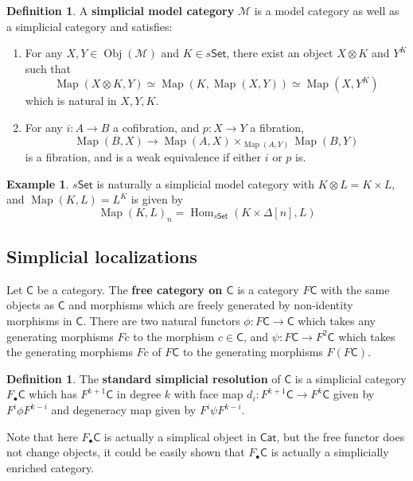 \documentclass[11pt]{amsart}
\numberwithin{equation}{section}
\theoremstyle{definition}
\newtheorem{example}[thm]{Example}
\newtheorem{defn}[thm]{Definition}
\theoremstyle{remark}
\numberwithin{equation}{section}
\newcommand{\CM}{{\mathcal M}}
\newcommand{\CC}{{\mathsf C}}
\newcommand{\ob}{\operatorname{Obj}}
\newcommand{\set}{\mathsf{Set}}
\newcommand{\cat}{\mathsf{Cat}}
\newcommand{\Hom}{\operatorname{Hom}}
\newcommand{\map}{\operatorname{Map}}
\begin{document}
\begin{defn}
	A {\bf simplicial model category} $\CM$ is a model category as well as a simplicial category and satisfies:
	\begin{enumerate}
		\item For any $X, Y \in \ob(\CM)$ and $K\in s\set$, there exist an object $X\otimes K$ and $Y^K$ such that
		\begin{equation*}
		\map(X\otimes K, Y)\simeq \map (K, \map (X,Y))\simeq \map (X, Y^K)
		\end{equation*} 
		which is natural in $X, Y, K$.
		\item  For any $i: A\to B$ a cofibration, and $p:X\to Y$ a fibration,
		\begin{equation*}
		 \map(B,X) \to \map (A,X) \times_{\map(A,Y)} \map(B, Y)
		\end{equation*}
		is a fibration, and is a weak equivalence if either $i$ or $p$ is.
	\end{enumerate}
\end{defn}

\begin{example}
	$s\set$ is naturally a simplicial model category with $K\otimes L = K \times L$, and $\map(K,L)=L^K$ is given by
	\begin{equation*}
	\map(K,L)_n = \Hom_{s\set}(K\times \Delta[n], L)
	\end{equation*}
\end{example}
\subsection{Simplicial localizations}
Let $\CC$ be a category. The {\bf free category on $\CC$} is a category $F\CC$ with the same objects as $\CC$ and morphisms which are freely generated by non-identity morphisms in $\CC$. There are two natural functors $\phi: F\CC \to \CC$ which takes any generating morphisms $Fc$ to the morphism $c\in \CC$, and $\psi: F\CC \to F^2\CC$ which takes the generating morphisms $Fc$ of $F\CC$ to the generating morphisms $F(F\CC)$.


\begin{defn}
	The {\bf standard simplicial resolution} of $\CC$ is a simplicial category $F_{\bullet}\CC$ which has $F^{k+1}\CC$ in degree $k$ with face map $d_i: F^{k+1} \CC \to F^k \CC$ given by $F^i\phi F^{k-i}$ and degeneracy map given by $F^i\psi F^{k-i}$. 
\end{defn}
Note that here $F_{\bullet}\CC$ is actually a simplical object in $\cat$, but the free functor does not change objects, it could be easily shown that $F_{\bullet}\CC$ is actually a simplicially enriched category.
\end{document}
